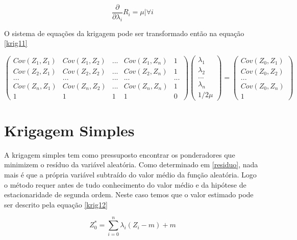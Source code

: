  \begin{equation}\label{krig10}
 \frac{\partial}{\partial \lambda_{i}}R_{i} = \mu | \forall i 
 \end{equation} 
 
 O sistema de equações da krigagem pode ser transformado então na equação \ref{krig11}
 
  \begin{equation}\label{krig11}
  \begin{pmatrix}
  Cov(Z_{1},Z_{1})&Cov(Z_{1},Z_{2})& ... & Cov(Z_{1},Z_{n})& 1\\ 
  Cov(Z_{2},Z_{1})&Cov(Z_{2},Z_{2})& ... & Cov(Z_{2},Z_{n})& 1 \\ 
  ...&...& ...&... & ...\\
  Cov(Z_{n},Z_{1})&Cov(Z_{n},Z_{2})& ... & Cov(Z_{n},Z_{n})& 1\\
  1&1& 1&1& 0
  \end{pmatrix} 
  \begin{pmatrix}
  \lambda _{1}\\ 
  \lambda _{2}\\ 
  ...\\ 
  \lambda _{n}\\
  1/2\mu
  \end{pmatrix}=\begin{pmatrix}
  Cov(Z_{0}, Z_{1})\\ 
  Cov(Z_{0}, Z_{2})\\  
  ...\\
  Cov(Z_{0}, Z_{n})\\
  1
  \end{pmatrix}
  \end{equation}

\section{Krigagem Simples}

A krigagem simples tem como pressuposto encontrar os ponderadores que minimizem o resíduo da variável aleatória. Como determinado em \ref{residuo}, nada mais é que a própria variável subtraído do valor médio da função aleatória. Logo o método requer antes de tudo conhecimento do valor médio  e da hipótese de estacionaridade de segunda ordem. Neste caso temos que o valor estimado pode ser descrito pela equação \eqref{krig12}  

 \begin{equation}\label{krig12}
 Z^*_{0} = \sum_{i=0}^{n} \lambda_{i}\left( Z_{i} - m \right) + m
 \end{equation}
 
